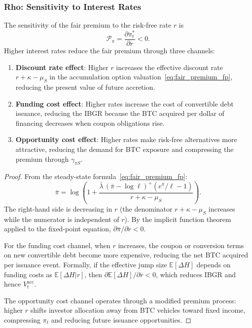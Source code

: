 \subsubsection{Rho: Sensitivity to Interest Rates}
\label{subsubsec:rho_rate}

\begin{proposition}
\label{prop:rho_premium}
The sensitivity of the fair premium to the risk-free rate $r$ is
\begin{equation}
\label{eq:rho_premium}
  \mathcal{P}_\pi = \frac{\partial \pi_t^*}{\partial r} < 0.
\end{equation}
Higher interest rates reduce the fair premium through three channels:
\begin{enumerate}
  \item \textbf{Discount rate effect}: Higher $r$ increases the effective discount rate $r + \kappa - \mu_S$ in the accumulation option valuation~\eqref{eq:fair_premium_fp}, reducing the present value of future accretion.
  \item \textbf{Funding cost effect}: Higher rates increase the cost of convertible debt issuance, reducing the IBGR because the BTC acquired per dollar of financing decreases when coupon obligations rise.
  \item \textbf{Opportunity cost effect}: Higher rates make risk-free alternatives more attractive, reducing the demand for BTC exposure and compressing the premium through $\gamma_{\pi S}$.
\end{enumerate}
\end{proposition}

\begin{proof}
From the steady-state formula~\eqref{eq:fair_premium_fp}:
\[
  \bar{\pi} = \log\!\left(1 + \frac{\bar{\lambda}\,(\bar{\pi} - \log\ell)^+ (e^{\bar{\pi}}/\ell - 1)}{r + \kappa - \mu_S}\right).
\]
The right-hand side is decreasing in $r$ (the denominator $r + \kappa - \mu_S$ increases while the numerator is independent of $r$). By the implicit function theorem applied to the fixed-point equation, $\partial\bar{\pi}/\partial r < 0$.

For the funding cost channel, when $r$ increases, the coupon or conversion terms on new convertible debt become more expensive, reducing the net BTC acquired per issuance event. Formally, if the effective jump size $\mathbb{E}[\Delta H]$ depends on funding costs as $\mathbb{E}[\Delta H | r]$, then $\partial \mathbb{E}[\Delta H] / \partial r < 0$, which reduces IBGR and hence $V_t^{\mathrm{acc}}$.

The opportunity cost channel operates through a modified premium process: higher $r$ shifts investor allocation away from BTC vehicles toward fixed income, compressing $\pi_t$ and reducing future issuance opportunities.
\end{proof}

